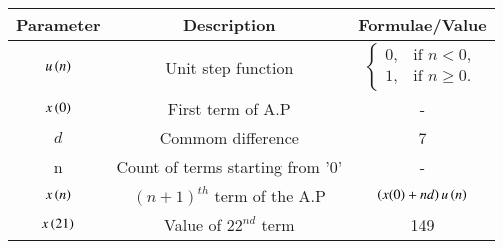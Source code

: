 \renewcommand{\arraystretch}{2}
\begin{tabular}{|c|c|c|}
\hline 
\setlength{\tabcolsep}{1pt}
\textbf{Parameter}  &\textbf{Description} &\textbf{Formulae/Value} \\
\hline
$u\left(n\right)$ & Unit step function & $\begin{cases}
0, & \text{if } n < 0, \\
1, & \text{if } n \geq 0.
\end{cases}$\\
\hline
$x\left(0\right)$ & First term of A.P & - \\
\hline
\textbf{$d$} & Commom difference & 7 \\
\hline
n & Count of terms starting from '0' & - \\
\hline
$x\left(n\right)$ & $(n+1)^{th}$ term of the A.P & $\left(x(0)+nd\right)u\left(n\right)$ \\
\hline
$x\left(21\right)$ & Value of $22^{nd}$ term & 149 \\

\hline

\end{tabular}
